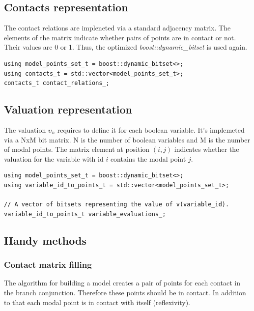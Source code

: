 \documentclass{article}
\begin{document}
	\newpage
	\subsection{Contacts representation}
	The contact relations are impleneted via a standard adjacency matrix. The elements of the matrix indicate whether pairs of points are in contact or not. Their values are 0 or 1. Thus, the optimized \textit{boost::dynamic\_bitset} is used again.

\begin{lstlisting}
using model_points_set_t = boost::dynamic_bitset<>;
using contacts_t = std::vector<model_points_set_t>;
contacts_t contact_relations_;
\end{lstlisting}

	\subsection{Valuation representation}
	The valuation $\upsilon_n$ requires to define it for each boolean variable. It's implemeted via a NxM bit matrix. N is the number of boolean variables and M is the number of modal points. The matrix element at position $(i, j)$ indicates whether the valuation for the variable with id $i$ contains the modal point $j$.

\begin{lstlisting}
using model_points_set_t = boost::dynamic_bitset<>;
using variable_id_to_points_t = std::vector<model_points_set_t>;

// A vector of bitsets representing the value of v(variable_id).
variable_id_to_points_t variable_evaluations_;
\end{lstlisting}

	\subsection{Handy methods}
	\subsubsection*{Contact matrix filling}
	The algorithm for building a model creates a pair of points for each contact in the branch conjunction. Therefore these points should be in contact. In addition to that each modal point is in contact with itself (reflexivity).
\end{document}
